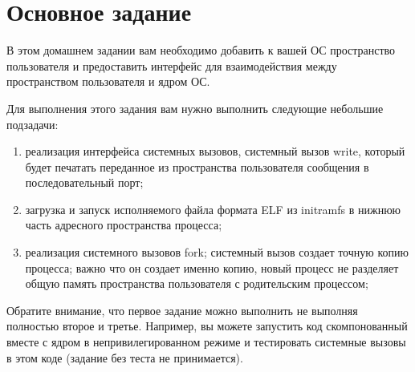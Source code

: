 \section{Основное задание}

В этом домашнем задании вам необходимо добавить к вашей ОС пространство
пользователя и предоставить интерфейс для взаимодействия между пространством
пользователя и ядром ОС.

Для выполнения этого задания вам нужно выполнить следующие небольшие подзадачи:

\begin{enumerate}
  \item реализация интерфейса системных вызовов, системный вызов write, который
        будет печатать переданное из пространства пользователя сообщения в
        последовательный порт;
  \item загрузка и запуск исполняемого файла формата ELF из initramfs в нижнюю
        часть адресного пространства процесса;
  \item реализация системного вызовов fork; системный вызов создает точную
        копию процесса; важно что он создает именно копию, новый процесс не
        разделяет общую память пространства пользователя с родительским процессом;
\end{enumerate}

Обратите внимание, что первое задание можно выполнить не выполняя полностью
второе и третье. Например, вы можете запустить код скомпонованный вместе с
ядром в непривилегированном режиме и тестировать системные вызовы в этом коде
(задание без теста не принимается).
